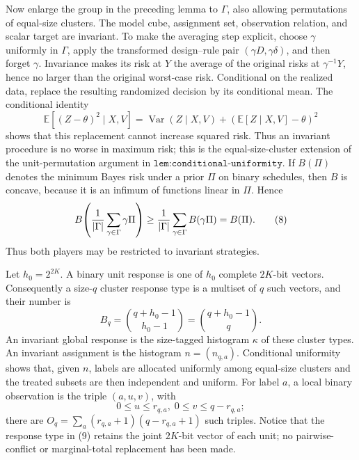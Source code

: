 Now enlarge the group in the preceding lemma to \(\Gamma\), also allowing
permutations of equal-size clusters.  The model cube, assignment set,
observation relation, and scalar target are invariant.  To make the averaging
step explicit, choose \(\gamma\) uniformly in \(\Gamma\), apply the transformed
design--rule pair \((\gamma D,\gamma\delta)\), and then forget \(\gamma\).
Invariance makes its risk at \(Y\) the average of the original risks at
\(\gamma^{-1}Y\), hence no larger than the original worst-case risk.  Conditional
on the realized data, replace the resulting randomized decision by its
conditional mean.  The conditional identity
\[
 \mathbb E[(Z-\theta)^2\mid X,V]
 =\operatorname{Var}(Z\mid X,V)
  +(\mathbb E[Z\mid X,V]-\theta)^2
\]
shows that this replacement cannot increase squared risk.  Thus an invariant
procedure is no worse in maximum risk; this is the equal-size-cluster extension
of the unit-permutation argument in
\(\texttt{lem:conditional-uniformity}\).  If \(B(\Pi)\) denotes the minimum
Bayes risk under a prior \(\Pi\) on binary schedules, then \(B\) is concave,
because it is an infimum of functions linear in \(\Pi\).  Hence
\[
 B\!\left({1\over|\Gamma|}\sum_{\gamma\in\Gamma}\gamma\Pi\right)
 \ge {1\over|\Gamma|}\sum_{\gamma\in\Gamma}B(\gamma\Pi)=B(\Pi).       \tag{8}
\]
Thus both players may be restricted to invariant strategies.

Let \(h_0=2^{2K}\).  A binary unit response is one of \(h_0\) complete \(2K\)-bit vectors.  Consequently a size-\(q\) cluster response type is a multiset of \(q\) such vectors, and their number is
\[
 B_q=\binom{q+h_0-1}{h_0-1}=\binom{q+h_0-1}{q}.                             \tag{9}
\]
An invariant global response is the size-tagged histogram \(\kappa\) of these cluster types.  An invariant assignment is the histogram \(n=(n_{q,a})\).  Conditional uniformity shows that, given \(n\), labels are allocated uniformly among equal-size clusters and the treated subsets are then independent and uniform.  For label \(a\), a local binary observation is the triple \((a,u,v)\), with
\[
 0\le u\le r_{q,a},\; 0\le v\le q-r_{q,a};                               \tag{10}
\]
there are \(O_q=\sum_a(r_{q,a}+1)(q-r_{q,a}+1)\) such triples.  Notice that the response type in (9) retains the joint \(2K\)-bit vector of each unit; no pairwise-conflict or marginal-total replacement has been made.

